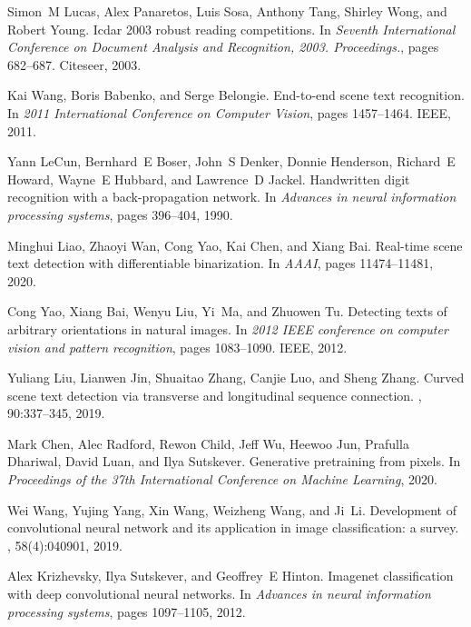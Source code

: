 \documentclass[10pt,twocolumn,letterpaper]{article}
\begin{document}
{\begin{thebibliography}{10}
Simon~M Lucas, Alex Panaretos, Luis Sosa, Anthony Tang, Shirley Wong, and
  Robert Young.
\newblock Icdar 2003 robust reading competitions.
\newblock In {\em Seventh International Conference on Document Analysis and
  Recognition, 2003. Proceedings.}, pages 682--687. Citeseer, 2003.


Kai Wang, Boris Babenko, and Serge Belongie.
\newblock End-to-end scene text recognition.
\newblock In {\em 2011 International Conference on Computer Vision}, pages
  1457--1464. IEEE, 2011.



Yann LeCun, Bernhard~E Boser, John~S Denker, Donnie Henderson, Richard~E
  Howard, Wayne~E Hubbard, and Lawrence~D Jackel.
\newblock Handwritten digit recognition with a back-propagation network.
\newblock In {\em Advances in neural information processing systems}, pages
  396--404, 1990.


Minghui Liao, Zhaoyi Wan, Cong Yao, Kai Chen, and Xiang Bai.
\newblock Real-time scene text detection with differentiable binarization.
\newblock In {\em AAAI}, pages 11474--11481, 2020.


Cong Yao, Xiang Bai, Wenyu Liu, Yi~Ma, and Zhuowen Tu.
\newblock Detecting texts of arbitrary orientations in natural images.
\newblock In {\em 2012 IEEE conference on computer vision and pattern
  recognition}, pages 1083--1090. IEEE, 2012.

Yuliang Liu, Lianwen Jin, Shuaitao Zhang, Canjie Luo, and Sheng Zhang.
\newblock Curved scene text detection via transverse and longitudinal sequence
  connection.
, 90:337--345, 2019.


Mark Chen, Alec Radford, Rewon Child, Jeff Wu, Heewoo Jun, Prafulla Dhariwal,
  David Luan, and Ilya Sutskever.
\newblock Generative pretraining from pixels.
\newblock In {\em Proceedings of the 37th International Conference on Machine
  Learning}, 2020.



Wei Wang, Yujing Yang, Xin Wang, Weizheng Wang, and Ji~Li.
\newblock Development of convolutional neural network and its application in
  image classification: a survey.
, 58(4):040901, 2019.

Alex Krizhevsky, Ilya Sutskever, and Geoffrey~E Hinton.
\newblock Imagenet classification with deep convolutional neural networks.
\newblock In {\em Advances in neural information processing systems}, pages
  1097--1105, 2012.



\end{thebibliography}}
\end{document}
